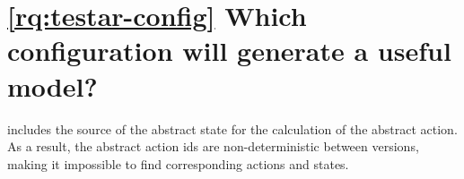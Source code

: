 \section{\ref{rq:testar-config} Which \testar configuration will generate a useful model?}


\testar includes the source of the abstract state for the calculation of the abstract action. As a result, the abstract action ids are non-deterministic between versions, making it impossible to find corresponding actions and states. 
